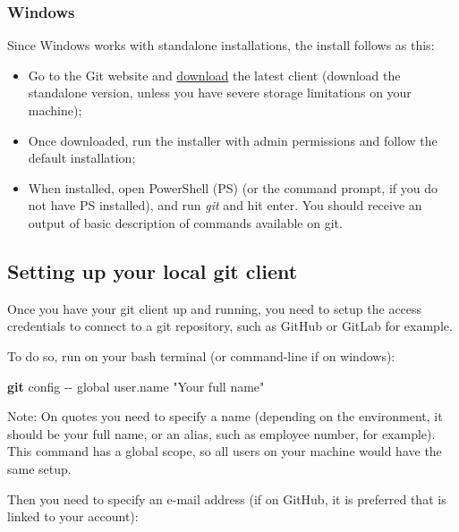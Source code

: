 \documentclass[
]{book}
\newenvironment{Shaded}{\begin{snugshade}}{\end{snugshade}}
\newcommand{\AttributeTok}[1]{\textcolor[rgb]{0.13,0.29,0.53}{#1}}
\newcommand{\FunctionTok}[1]{\textcolor[rgb]{0.13,0.29,0.53}{\textbf{#1}}}
\newcommand{\NormalTok}[1]{#1}
\newcommand{\StringTok}[1]{\textcolor[rgb]{0.31,0.60,0.02}{#1}}
\providecommand{\tightlist}{%
  \setlength{\itemsep}{0pt}\setlength{\parskip}{0pt}}
\begin{document}
\hypertarget{windows}{%
\subsubsection{Windows}\label{windows}}

Since Windows works with standalone installations, the install follows as this:

\begin{itemize}
\tightlist
\item
  Go to the Git website and \href{https://git-scm.com/download/win}{download} the
  latest client (download the standalone version, unless you have severe storage
  limitations on your machine);
\item
  Once downloaded, run the installer with admin permissions and follow the
  default installation;
\item
  When installed, open PowerShell (PS) (or the command prompt, if you do not
  have PS installed), and run \emph{git} and hit enter. You should receive an output of basic
  description of commands available on git.
\end{itemize}

\hypertarget{setting-up-your-local-git-client}{%
\subsection{Setting up your local git client}\label{setting-up-your-local-git-client}}

Once you have your git client up and running, you need to setup the access
credentials to connect to a git repository, such as GitHub or GitLab for example.

To do so, run on your bash terminal (or command-line if on windows):

\begin{Shaded}
\begin{Highlighting}[]
\FunctionTok{git}\NormalTok{ config }\AttributeTok{{-}{-}}\NormalTok{ global user.name }\StringTok{"Your full name"}
\end{Highlighting}
\end{Shaded}

Note: On quotes you need to specify a name (depending on the environment,
it should be your full name, or an alias, such as employee number, for example). This
command has a global scope, so all users on your machine would have the same setup.

Then you need to specify an e-mail address (if on GitHub, it is preferred that
is linked to your account):
\end{document}
